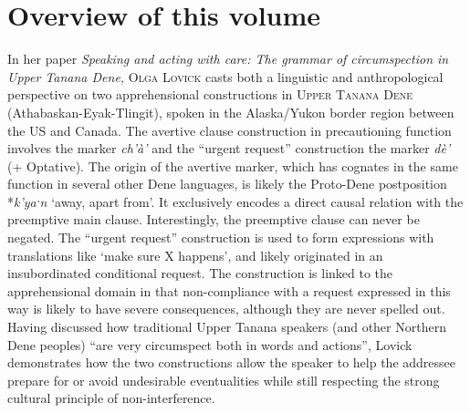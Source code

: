 \documentclass[output=paper,colorlinks,citecolor=brown
]{langscibook}
\begin{document}
\section{Overview of this volume}
\label{sec:summaries}

In her paper \textit{Speaking and acting with care: The grammar of circumspection in Upper Tanana Dene,} \textsc{Olga} \textsc{Lovick} casts both a linguistic and anthropological perspective on two apprehensional constructions in \textsc{Upper} \textsc{Tanana} \textsc{Dene} (Athabaskan-Eyak-Tlingit), spoken in the Alaska/Yukon border region between the US and Canada. The avertive clause construction in precautioning function involves the marker \textit{ch'à'} and the ``urgent request'' construction the marker \textit{dè'} (+ Optative). The origin of the avertive marker, which has cognates in the same function in several other Dene languages, is likely the Proto-Dene postposition *\textit{k'yaˑn} `away, apart from'. It exclusively encodes a direct causal relation with the preemptive main clause. Interestingly, the preemptive clause can never be negated. The ``urgent request'' construction is used to form expressions with translations like `make sure X happens', and likely originated in an insubordinated conditional request. The construction is linked to the apprehensional domain in that non-compliance with a request expressed in this way is likely to have severe  consequences, although they are never spelled out. Having discussed how traditional Upper Tanana speakers (and other Northern Dene peoples) ``are very circumspect both in words and actions'', Lovick demonstrates how the two constructions allow the speaker to help the addressee prepare for or avoid undesirable eventualities while still respecting the strong cultural principle of non-interference.
\end{document}
